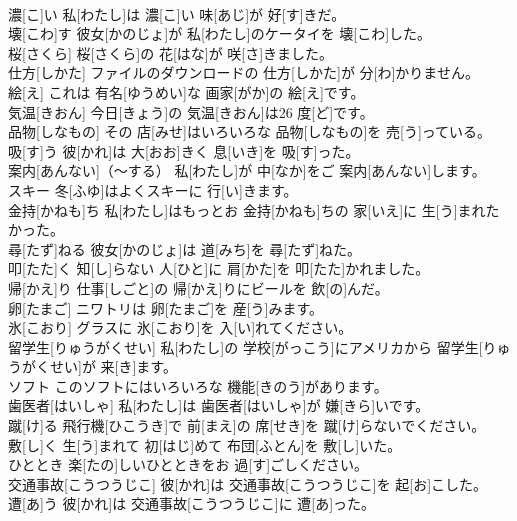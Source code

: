 \documentclass[8pt]{extreport}
\begin{document}
\begin{CJK}{UTF8}{min}
\\	濃[こ]い	私[わたし]は 濃[こ]い 味[あじ]が 好[す]きだ。		
\\	壊[こわ]す	彼女[かのじょ]が 私[わたし]のケータイを 壊[こわ]した。		
\\	桜[さくら]	桜[さくら]の 花[はな]が 咲[さ]きました。		
\\	仕方[しかた]	ファイルのダウンロードの 仕方[しかた]が 分[わ]かりません。		
\\	絵[え]	これは 有名[ゆうめい]な 画家[がか]の 絵[え]です。		
\\	気温[きおん]	今日[きょう]の 気温[きおん]は26 度[ど]です。		
\\	品物[しなもの]	その 店[みせ]はいろいろな 品物[しなもの]を 売[う]っている。		
\\	吸[す]う	彼[かれ]は 大[おお]きく 息[いき]を 吸[す]った。		
\\	案内[あんない]（～する）	私[わたし]が 中[なか]をご 案内[あんない]します。		
\\	スキー	冬[ふゆ]はよくスキーに 行[い]きます。		
\\	金持[かねも]ち	私[わたし]はもっとお 金持[かねも]ちの 家[いえ]に 生[う]まれたかった。		
\\	尋[たず]ねる	彼女[かのじょ]は 道[みち]を 尋[たず]ねた。		
\\	叩[たた]く	知[し]らない 人[ひと]に 肩[かた]を 叩[たた]かれました。		
\\	帰[かえ]り	仕事[しごと]の 帰[かえ]りにビールを 飲[の]んだ。		
\\	卵[たまご]	ニワトリは 卵[たまご]を 産[う]みます。		
\\	氷[こおり]	グラスに 氷[こおり]を 入[い]れてください。		
\\	留学生[りゅうがくせい]	私[わたし]の 学校[がっこう]にアメリカから 留学生[りゅうがくせい]が 来[き]ます。		
\\	ソフト	このソフトにはいろいろな 機能[きのう]があります。		
\\	歯医者[はいしゃ]	私[わたし]は 歯医者[はいしゃ]が 嫌[きら]いです。		
\\	蹴[け]る	飛行機[ひこうき]で 前[まえ]の 席[せき]を 蹴[け]らないでください。		
\\	敷[し]く	生[う]まれて 初[はじ]めて 布団[ふとん]を 敷[し]いた。		
\\	ひととき	楽[たの]しいひとときをお 過[す]ごしください。		
\\	交通事故[こうつうじこ]	彼[かれ]は 交通事故[こうつうじこ]を 起[お]こした。		
\\	遭[あ]う	彼[かれ]は 交通事故[こうつうじこ]に 遭[あ]った。		

\end{CJK}
\end{document}
